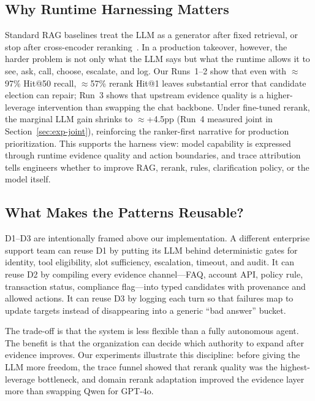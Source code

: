 \documentclass[sigconf,review]{acmart}
\begin{document}
\subsection{Why Runtime Harnessing Matters}
Standard RAG baselines treat the LLM as a generator after fixed retrieval, or stop after cross-encoder reranking~\cite{nogueira2019bert}.
In a production takeover, however, the harder problem is not only what the LLM says but what the runtime allows it to see, ask, call, choose, escalate, and log.
Our Runs~1--2 show that even with $\approx$97\% Hit@50 recall, $\approx$57\% rerank Hit@1 leaves substantial error that candidate election can repair; Run~3 shows that upstream evidence quality is a higher-leverage intervention than swapping the chat backbone.
Under fine-tuned rerank, the marginal LLM gain shrinks to $\approx$+4.5pp (Run~4 measured joint in Section~\ref{sec:exp-joint}), reinforcing the ranker-first narrative for production prioritization.
This supports the harness view: model capability is expressed through runtime evidence quality and action boundaries, and trace attribution tells engineers whether to improve RAG, rerank, rules, clarification policy, or the model itself.

\subsection{What Makes the Patterns Reusable?}
D1--D3 are intentionally framed above our implementation. A different enterprise support team can reuse D1 by putting its LLM behind deterministic gates for identity, tool eligibility, slot sufficiency, escalation, timeout, and audit. It can reuse D2 by compiling every evidence channel---FAQ, account API, policy rule, transaction status, compliance flag---into typed candidates with provenance and allowed actions. It can reuse D3 by logging each turn so that failures map to update targets instead of disappearing into a generic ``bad answer'' bucket.

The trade-off is that the system is less flexible than a fully autonomous agent. The benefit is that the organization can decide which authority to expand after evidence improves. Our experiments illustrate this discipline: before giving the LLM more freedom, the trace funnel showed that rerank quality was the highest-leverage bottleneck, and domain rerank adaptation improved the evidence layer more than swapping Qwen for GPT-4o.
\end{document}

